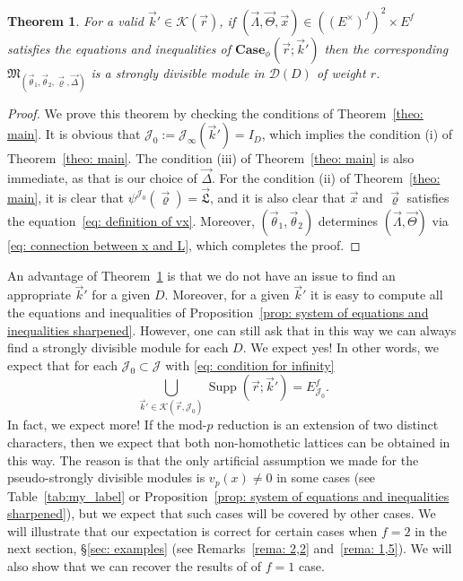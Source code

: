 \documentclass[11pt]{amsart}
\theoremstyle{definition}
\numberwithin{equation}{subsection}
\theoremstyle{plain}
\newtheorem{theo}[equation]{Theorem}
\theoremstyle{plain}
\theoremstyle{plain}
\theoremstyle{plain}
\theoremstyle{plain}
\theoremstyle{plain}
\theoremstyle{plain}
\theoremstyle{plain}
\theoremstyle{plain}
\theoremstyle{plain}
\theoremstyle{plain}
\theoremstyle{plain}
\theoremstyle{definition}
\theoremstyle{definition}
\theoremstyle{definition}
\theoremstyle{remark}
\renewcommand{\(}{\textup{(}}
\renewcommand{\)}{\textup{)}}
\newcommand{\fM}{\mathfrak{M}}
\newcommand{\fL}{\mathfrak{L}}
\newcommand{\cD}{\mathcal{D}}
\newcommand{\cJ}{\mathcal{J}}
\newcommand{\vx}{\vec{x}}
\newcommand{\vr}{\vec{r}}
\newcommand{\vL}{\vec{\fL}}
\newcommand{\vk}{\vec{k}}
\newcommand{\cK}{\mathcal{K}}
\newcommand{\vth}{\vec{\theta}}
\newcommand{\vrho}{\vec{\varrho}}
\newcommand{\vDel}{\vec{\Delta}}
\newcommand{\vLam}{\vec{\Lambda}}
\newcommand{\vTh}{\vec{\Theta}}
\DeclareMathOperator{\Supp}{Supp}
\begin{document}
\begin{theo}\label{theo: main 2}
For a valid $\vk'\in\cK(\vr)$, if $(\vLam,\vTh,\vx)\in ((E^\times)^f)^2\times E^f$ satisfies the equations and inequalities of  $\mathbf{Case}_\phi(\vr;\vk')$ then the corresponding $\fM_{(\vth_1,\vth_2,\vrho,\vDel)}$ is a strongly divisible module in $\cD(D)$ of weight $r$.
\end{theo}

\begin{proof}
We prove this theorem by checking the conditions of Theorem~\ref{theo: main}. It is obvious that $\cJ_0:=\cJ_{\infty}(\vk')=I_D$, which implies the condition (i) of Theorem~\ref{theo: main}. The condition (iii) of Theorem~\ref{theo: main} is also immediate, as that is our choice of $\vDel$.
For the condition (ii) of Theorem~\ref{theo: main}, it is clear that $\psi^{\cJ_0}(\vrho)=\vL$, and it is also clear that $\vx$ and $\vrho$ satisfies the equation~\eqref{eq: definition of vx}. Moreover, $(\vth_1,\vth_2)$ determines $(\vLam,\vTh)$ via \eqref{eq: connection between x and L}, which completes the proof.
\end{proof}

An advantage of Theorem~\ref{theo: main 2} is that we do not have an issue to find an appropriate $\vk'$ for a given $D$. Moreover, for a given $\vk'$ it is easy to compute all the equations and inequalities of Proposition~\ref{prop: system of equations and inequalities sharpened}. However, one can still ask that in this way we can always find a strongly divisible module for each $D$. We expect yes! In other words, we expect that for each $\cJ_0\subset\cJ$ with \eqref{eq: condition for infinity}
\begin{equation}\label{eq: conjecture}
\bigcup_{\vk'\in \cK(\vr,\cJ_0)}\Supp(\vr;\vk')=E^f_{\cJ_0}.
\end{equation}
In fact, we expect more! If the mod-$p$ reduction is an extension of two distinct characters, then we expect that both non-homothetic lattices can be obtained in this way. The reason is that the only artificial assumption we made for the pseudo-strongly divisible modules is $v_p(x)\neq 0$ in some cases (see Table~\ref{tab:my_label} or Proposition~\ref{prop: system of equations and inequalities sharpened}), but we expect that such cases will be covered by other cases. We will illustrate that our expectation is correct for certain cases when $f=2$ in the next section, \S\ref{sec: examples} (see Remarks~\ref{rema: 2,2} and~\ref{rema: 1,5}). We will also show that we can recover the results of \cite{BM,GP,LP} of $f=1$ case.
\end{document}

